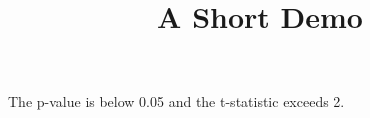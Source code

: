 \documentclass[article]{jss}
\title{A Short Demo}
\begin{document}
The p-value is below 0.05 and the t-statistic exceeds 2.
\end{document}
